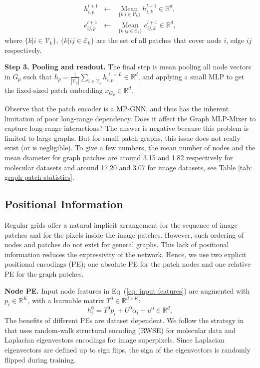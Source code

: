 \documentclass{article}
\begin{document}
\begin{eqnarray}
h_{i,p}^{l+1} &\leftarrow & \mathop{\textrm{Mean}}\limits_{\{k | i\in \mathcal{V}_k\}} h_{i,k}^{l+1} \in\mathbb{R}^{d},\\
e_{ij,p}^{l+1} &\leftarrow & \mathop{\textrm{Mean}}\limits_{\{k | ij\in \mathcal{E}_k\}} e_{ij,k}^{l+1} \in\mathbb{R}^{d},
\end{eqnarray}
where $\{k | i\in \mathcal{V}_k\}$, $\{k | ij\in \mathcal{E}_k\}$ are the set of all patches that cover node $i$, edge $ij$ respectively.

\textbf{Step 3. Pooling and readout.} The final step is mean pooling all node vectors in $G_p$ such that $h_p=\frac{1}{|\mathcal{V}_p|}\sum_{i\in \mathcal{V}_p} h_{i, p}^{\ell=L}\in\mathbb{R}^{d}$, and applying a small MLP to get the fixed-sized patch embedding $x_{G_p}\in\mathbb{R}^{d}$.

Observe that the patch encoder is a MP-GNN, and thus has the inherent limitation of poor long-range dependency. Does it affect the Graph MLP-Mixer to capture long-range interactions? The answer is negative because this problem is limited to large graphs. But for small patch graphs, this issue does not really exist (or is negligible). To give a few numbers, the mean number of nodes and the mean diameter for graph patches are around 3.15 and 1.82 respectively for molecular datasets and around 17.20 and 3.07 for image datasets, see Table \ref{tab: graph patch statistics}.

\subsection{Positional Information}
Regular grids offer a natural implicit arrangement for the sequence of image patches and for the pixels inside the image patches. However, such ordering of nodes and patches do not exist for general graphs. This lack of positional information reduces the expressivity of the network. Hence, we use two explicit positional encodings (PE); one absolute PE for the patch nodes and one relative PE for the graph patches. 


\textbf{Node PE.} Input node features in Eq~(\ref{eq: input features}) are augmented with $p_i\in \mathbb{R}^K$, with a learnable matrix $T^0 \in \mathbb{R}^{d\times K}$:
\begin{equation}
 h_i^0=T^0 p_i + U^0\alpha_i + u^0 \in\mathbb{R}^{d},
 \label{eq: nodePE}
\end{equation}The benefits of different PEs are dataset dependent. We follow the strategy in~\citep{rampavsek2022recipe} that uses random-walk structural encoding (RWSE) \citep{dwivedi2021graph} for molecular data and Laplacian eigenvectors encodings \citep{dwivedi2020benchmarking} for image superpixels. Since Laplacian eigenvectors are defined up to  sign flips, the sign of the eigenvectors is randomly flipped during training.
\end{document}
